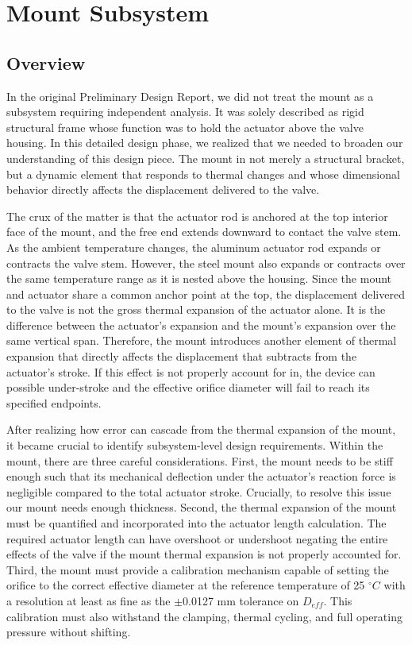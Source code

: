 \documentclass[12pt, letterpaper]{report}%
\newcounter{mycounter}           %
\newcounter{sub}[mycounter]      %
\newcommand{\degC}{^{\circ}C}    %
\begin{document}
    \section{Mount Subsystem}

     \subsection{Overview}

            In the original Preliminary Design Report, we did not treat the mount as a subsystem requiring independent analysis. It was solely described as rigid structural frame whose function was to hold
            the actuator above the valve housing. In this detailed design phase, we realized that we needed to broaden our understanding of this design piece. The mount in not merely a structural bracket, but a dynamic
            element that responds to thermal changes and whose dimensional behavior directly affects the displacement delivered to the valve. 

            The crux of the matter is that the actuator rod is anchored at the top interior face of the mount, and the free end extends downward to contact the valve stem. As the ambient temperature changes, the aluminum actuator
            rod expands or contracts the valve stem. However, the steel mount also expands or contracts over the same temperature range as it is nested above the housing. Since the mount and actuator share a common anchor point at the top, the displacement
            delivered to the valve is not the gross thermal expansion of the actuator alone. It is the difference between the actuator's expansion and the mount's expansion over the same vertical span. Therefore, the mount introduces another element of thermal
            expansion that directly affects the displacement that subtracts from the actuator's stroke. If this effect is not properly account for in, the device can possible under-stroke and the effective orifice diameter will fail to reach its specified endpoints.

            After realizing how error can cascade from the thermal expansion of the mount, it became crucial to identify subsystem-level design requirements. Within the mount, there are three careful considerations. First, the mount needs to be stiff enough such that its mechanical
            deflection under the actuator's reaction force is negligible compared to the total actuator stroke. Crucially, to resolve this issue our mount needs enough thickness. Second, the thermal expansion of the mount must be quantified and incorporated into the actuator length calculation.
            The required actuator length can have overshoot or undershoot negating the entire effects of the valve if the mount thermal expansion is not properly accounted for. Third, the mount must provide a calibration mechanism capable of setting the orifice to the correct effective diameter
            at the reference temperature of 25 $\degC$ with a resolution at least as fine as the $\pm$0.0127 mm tolerance on $D_{eff}$. This calibration must also withstand the clamping, thermal cycling, and full operating pressure without shifting. 
\end{document}

